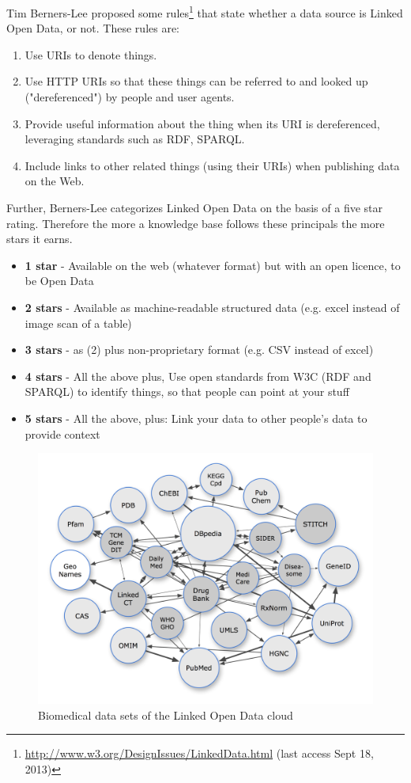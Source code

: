 Tim Berners-Lee proposed some rules\footnote{\url{http://www.w3.org/DesignIssues/LinkedData.html} (last access Sept 18, 2013)} that state whether a data source is Linked Open Data, or not.
These rules are:
\begin{enumerate}
\item Use URIs to denote things.
\item Use HTTP URIs so that these things can be referred to and looked up ("dereferenced") by people and user agents.
\item Provide useful information about the thing when its URI is dereferenced, leveraging standards such as RDF, SPARQL.
\item Include links to other related things (using their URIs) when publishing data on the Web.
\end{enumerate}

Further, Berners-Lee categorizes Linked Open Data on the basis of a five star rating.
Therefore the more a knowledge base follows these principals the more stars it earns.
\begin{itemize}
\item \textbf{1 star} - Available on the web (whatever format) but with an open licence, to be Open Data
\item \textbf{2 stars} - Available as machine-readable structured data (e.g. excel instead of image scan of a table)
\item \textbf{3 stars} - as (2) plus non-proprietary format (e.g. CSV instead of excel)
\item \textbf{4 stars} - All the above plus, Use open standards from W3C (RDF and SPARQL) to identify things, so that people can point at your stuff
\item \textbf{5 stars} - All the above, plus: Link your data to other people’s data to provide context
\end{itemize}

\begin{figure}
  \centering
  \includegraphics[scale=0.7]{preliminaries/2010-12-04_lodd_cloud.png}%
  \caption{Biomedical data sets of the Linked Open Data cloud}%
  \label{fig:lod_cloud}
\end{figure}


